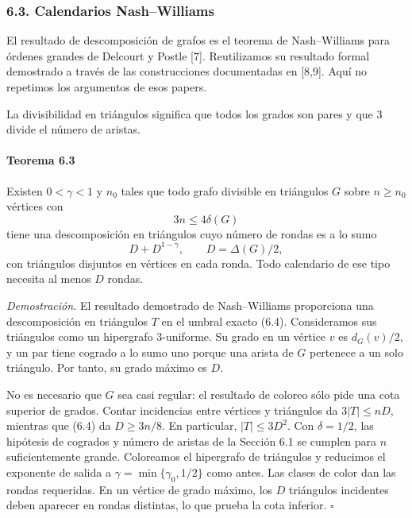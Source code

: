 \documentclass[spanish,11pt,a4paper]{article}
\begin{document}
\subsubsection{6.3. Calendarios Nash--Williams}\label{calendarios-nashwilliams}

El resultado de descomposición de grafos es el teorema de Nash--Williams para órdenes grandes de Delcourt y Postle {[}7{]}. Reutilizamos su resultado formal demostrado a través de las construcciones documentadas en {[}8,9{]}. Aquí no repetimos los argumentos de esos papers.

La divisibilidad en triángulos significa que todos los grados son pares y que \(3\) divide el número de aristas.

\par
\begin{samepage}
\paragraph{Teorema 6.3}\label{teorema-6.3}

Existen \(0<\gamma<1\) y \(n_0\) tales que todo grafo divisible en triángulos \(G\) sobre \(n\ge n_0\) vértices con \[3n\le4\delta(G)
\tag{6.4}\] tiene una descomposición en triángulos cuyo número de rondas es a lo sumo \[D+D^{1-\gamma},\qquad D=\Delta(G)/2,
\tag{6.5}\] con triángulos disjuntos en vértices en cada ronda. Todo calendario de ese tipo necesita al menos \(D\) rondas.

\end{samepage}
\emph{Demostración.} El resultado demostrado de Nash--Williams proporciona una descomposición en triángulos \(T\) en el umbral exacto (6.4). Consideramos sus triángulos como un hipergrafo \(3\)-uniforme. Su grado en un vértice \(v\) es \(d_G(v)/2\), y un par tiene cogrado a lo sumo uno porque una arista de \(G\) pertenece a un solo triángulo. Por tanto, su grado máximo es \(D\).

No es necesario que \(G\) sea casi regular: el resultado de coloreo sólo pide una cota superior de grados. Contar incidencias entre vértices y triángulos da \(3|T|\le nD\), mientras que (6.4) da \(D\ge3n/8\). En particular, \(|T|\le3D^2\). Con \(\delta=1/2\), las hipótesis de cogrados y número de aristas de la Sección 6.1 se cumplen para \(n\) suficientemente grande. Coloreamos el hipergrafo de triángulos y reducimos el exponente de salida a \(\gamma=\min\{\gamma_0,1/2\}\) como antes. Las clases de color dan las rondas requeridas. En un vértice de grado máximo, los \(D\) triángulos incidentes deben aparecer en rondas distintas, lo que prueba la cota inferior. \(\square\)
\end{document}
